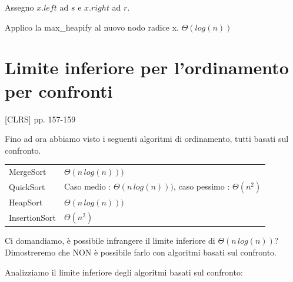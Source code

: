 \documentclass{article}
\begin{document}
{Assegno $x.left$ ad $s$ e $x.right$ ad $r$.}

{Applico la max\_heapify al nuovo nodo radice x. $\Theta(log(n))$}


\section{Limite inferiore per l'ordinamento per confronti}

{{[}CLRS{]} pp. 157-159}

{Fino ad ora abbiamo visto i seguenti algoritmi di ordinamento, tutti basati sul confronto.}

\begin{longtable}[]{@{}ll@{}}
\toprule
\begin{minipage}[t]{0.47\columnwidth}\raggedright\strut
{MergeSort}\strut
\end{minipage} & \begin{minipage}[t]{0.47\columnwidth}\raggedright\strut
$\Theta(n\,log(n)))$\strut
\end{minipage}\tabularnewline
\begin{minipage}[t]{0.47\columnwidth}\raggedright\strut
{QuickSort}\strut
\end{minipage} & \begin{minipage}[t]{0.47\columnwidth}\raggedright\strut
{Caso medio : $\Theta(n\,log(n)))$, caso pessimo : $\Theta(n^2)$}\strut
\end{minipage}\tabularnewline
\begin{minipage}[t]{0.47\columnwidth}\raggedright\strut
{HeapSort}\strut
\end{minipage} & \begin{minipage}[t]{0.47\columnwidth}\raggedright\strut
$\Theta(n\,log(n)))$\strut
\end{minipage}\tabularnewline
\begin{minipage}[t]{0.47\columnwidth}\raggedright\strut
{InsertionSort}\strut
\end{minipage} & \begin{minipage}[t]{0.47\columnwidth}\raggedright\strut
$\Theta(n^2)$\strut
\end{minipage}\tabularnewline
\bottomrule
\end{longtable}

{Ci domandiamo, è possibile infrangere il limite inferiore di $\Theta(n\,log(n))$? Dimostreremo che NON è possibile farlo con algoritmi basati sul confronto.}

{Analizziamo il limite inferiore degli algoritmi basati sul confronto:}
\end{document}
